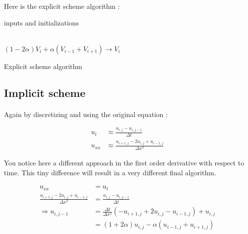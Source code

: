 \documentclass[a4paper, twoside, 11pt]{report}
\theoremstyle{theorem}
\theoremstyle{remark}
\theoremstyle{exemple}
\begin{document}
                    Here is the explicit scheme algorithm :

                    \begin{center}
                    \begin{algorithm}[H]

                    \SetAlgoLined

                        inputs and initializations 

                            \ \\
                            {
                                {
                                    $(1-2\alpha)V_i + \alpha(V_{i-1} + V_{i+1}) \rightarrow V_i$ \\
                                }
                            }

                    \caption{Explicit scheme algorithm}
                    \end{algorithm}
                    \end{center}


            \subsection{Implicit scheme}

                \paragraph{}Again by discretizing and using the original equation :

                    \begin{align*}
                        u_t & \approx \frac{u_{i,j} - u_{i,j-1}}{\Delta t} \\
                        u_{xx} &\approx \frac{u_{i+1,j}-2u_{i,j}+u_{i-1,j}}{\Delta x^2}
                    \end{align*}

                    You notice here a different approach in the first order derivative with respect to time. This tiny difference will result in a very different final algorithm.

                    \begin{align*}
                        u_{xx}&=u_t\\
                        \frac{u_{i+1,j}-2u_{i,j}+u_{i-1,j}}{\Delta x^2} &=    \frac{u_{i,j} - u_{i,j-1}}{\Delta t} \\
                        \Longrightarrow u_{i,j-1}&=\frac{\Delta t}{\Delta x^2}(-u_{i+1,j}+2u_{i,j}-u_{i-1,j})+u_{i,j} \\
                                &=(1+2\alpha)u_{i,j}-\alpha(u_{i-1,j}+u_{i+1,j})
                        \tag{5}
                    \end{align*}
\end{document}
